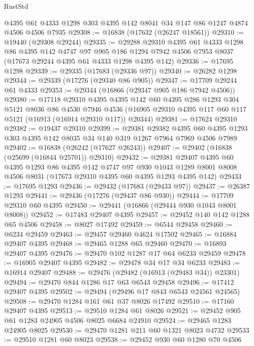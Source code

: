 \begin{lexlean}{RustStd}
\begin{coremodule}
    @4395
    @61
    @4333
    @1298
    @303
    @4395
    @142
    @8041
    @34
    @147
    @86
    @1247
    @4874
    @4506
    @4506
    @7935
@29308 := @16838 (@17632 (@26247 @18561))
@29310 := @19440 (@29308 @29244)
@29335 := @29288
    @29310
    @4395
    @61
    @4333
    @1298
    @86
    @4395
    @142
    @4747
    @97
    @905
    @186
    @1294
    @7942
    @4506
    @7953
    @8037
    (@17673 @29244 @4395 @61 @4333 @1298 @4395 @142)
@29336 := @17695 @1298
@29339 := @29335 (@17683 (@29336 @97))
@29340 := @26282 @1298
@29344 := @29339 (@17276 (@29340 @86 @905))
@29347 := @17709 @29244 @61 @4333
@29353 := @29344 (@16866 (@29347 @905 @186 @7942 @4506))
@29380 := @17118
    @29310
    @4395
    @4395
    @142
    @60
    @4395
    @286
    @1293
    @304
    @5121
    @8036
    @86
    @4530
    @7946
    @4536
    (@16905 @29310 @4395 @117 @60 @117 @5121 (@16913 (@16914 @29310 @117)) @20344)
@29381 := @17624 @29310
@29382 := @19437 @29310
@29399 := @29381
    @29382
    @4395
    @60
    @4395
    @1293
    @303
    @4395
    @142
    @8035
    @34
    @140
    @319
    @1267
    @7964
    @7969
    @4506
    @7989
@29402 := @16838 (@26242 (@17627 @26243))
@29407 := @29402 (@16838 (@25699 (@16844 @25701)) @29310)
@29432 := @29381
    @29407
    @4395
    @60
    @4395
    @1293
    @86
    @4395
    @142
    @4747
    @97
    @930
    @1043
    @1289
    @8001
    @8008
    @4506
    @8031
    (@17673 @29310 @4395 @60 @4395 @1293 @4395 @142)
@29433 := @17695 @1293
@29436 := @29432 (@17683 (@29433 @97))
@29437 := @26387 @1293
@29441 := @29436 (@17276 (@29437 @86 @930))
@29444 := @17709 @29310 @60 @4395
@29450 := @29441 (@16866 (@29444 @930 @1043 @8001 @8008))
@29452 := @17483 @29407 @4395
@29457 := @29452 @140 @142 @1288 @65 @4506
@29458 := @8027 @17492
@29459 := @6544 @29458
@29460 := @6234 @29459
@29463 := @29457 @29460 @4624 @17502
@29465 := @16884 @29407 @4395
@29468 := @29465 @1288 @65 @29460
@29470 := @16893 @29407 @4395
@29476 := @29470 @102 @1287 @17 @64 @6233 @29459
@29478 := @16905 @29407 @4395
@29482 := @29478 @34 @17 @34 @6233
@29483 := @16914 @29407
@29488 := @29476 (@29482 (@16913 (@29483 @34)) @23301)
@29494 := @29470 @844 @1286 @17 @63 @6543 @29458
@29496 := @17412 @29407 @4395
@29502 := @29494 (@29496 @17 @843 @6543 @24561 @24565)
@29508 := @29470 @1284 @161 @61 @37 @8026 @17492
@29510 := @17160 @29407 @4395
@29513 := @29510 @1284 @61 @8026
@29521 := @29452 @905 @61 @1283 @24905 @4506 @8025 @6684 @24910
@29524 := @29465 @1283 @24905 @8025
@29530 := @29470 @1281 @211 @60 @1321 @8023 @4732
@29533 := @29510 @1281 @60 @8023
@29538 := @29452 @930 @60 @1280 @70 @4506

\end{coremodule}
\end{lexlean}
